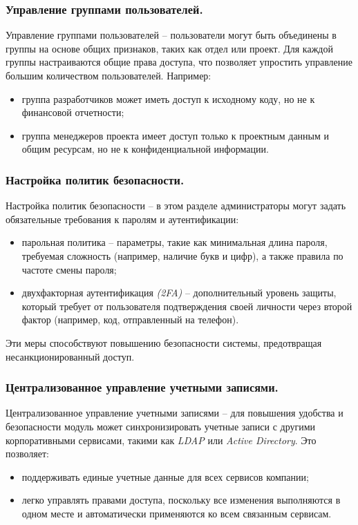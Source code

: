 \subsubsection{Управление группами пользователей.} Управление группами пользователей -- пользователи могут быть объединены в группы на основе общих признаков, таких как отдел или проект. Для каждой группы настраиваются общие права доступа, что позволяет упростить управление большим количеством пользователей. Например:
\begin{itemize}
    \item группа разработчиков может иметь доступ к исходному коду, но не к финансовой отчетности;
    \item группа менеджеров проекта имеет доступ только к проектным данным и общим ресурсам, но не к конфиденциальной информации.
\end{itemize}

\subsubsection{Настройка политик безопасности.} Настройка политик безопасности -- в этом разделе администраторы могут задать обязательные требования к паролям и аутентификации:
\begin{itemize}
    \item парольная политика -- параметры, такие как минимальная длина пароля, требуемая сложность (например, наличие букв и цифр), а также правила по частоте смены пароля;
    \item двухфакторная аутентификация \textit{(2FA)} -- дополнительный уровень защиты, который требует от пользователя подтверждения своей личности через второй фактор (например, код, отправленный на телефон).
\end{itemize}

Эти меры способствуют повышению безопасности системы, предотвращая несанкционированный доступ.

\subsubsection{Централизованное управление учетными записями.} Централизованное управление учетными записями -- для повышения удобства и безопасности модуль может синхронизировать учетные записи с другими корпоративными сервисами, такими как \textit{LDAP} или \textit{Active Directory}. Это позволяет:
\begin{itemize}
    \item поддерживать единые учетные данные для всех сервисов компании;
    \item легко управлять правами доступа, поскольку все изменения выполняются в одном месте и автоматически применяются ко всем связанным сервисам.
\end{itemize}

